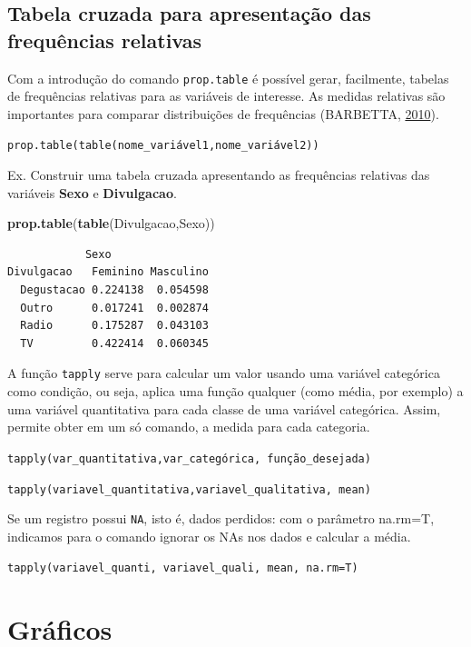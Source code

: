 \documentclass[12pt,brazil,oneside]{book}
\newenvironment{Shaded}{\begin{snugshade}}{\end{snugshade}}
\newcommand{\KeywordTok}[1]{\textcolor[rgb]{0.13,0.29,0.53}{\textbf{#1}}}
\newcommand{\NormalTok}[1]{#1}
\begin{document}
\hypertarget{tabela-cruzada-para-apresentacao-das-frequencias-relativas}{%
\subsection{Tabela cruzada para apresentação das frequências relativas}\label{tabela-cruzada-para-apresentacao-das-frequencias-relativas}}

Com a introdução do comando \texttt{prop.table} é possível gerar, facilmente, tabelas de frequências relativas para as variáveis de interesse. As medidas relativas são importantes para comparar distribuições de frequências (BARBETTA, \protect\hyperlink{ref-barbetta1988}{2010}).

\texttt{prop.table(table(nome\_variável1,nome\_variável2))}

Ex. Construir uma tabela cruzada apresentando as frequências relativas das variáveis \textbf{Sexo} e \textbf{Divulgacao}.

\begin{Shaded}
\begin{Highlighting}[]
\KeywordTok{prop.table}\NormalTok{(}\KeywordTok{table}\NormalTok{(Divulgacao,Sexo))}
\end{Highlighting}
\end{Shaded}

\begin{verbatim}
            Sexo
Divulgacao   Feminino Masculino
  Degustacao 0.224138  0.054598
  Outro      0.017241  0.002874
  Radio      0.175287  0.043103
  TV         0.422414  0.060345
\end{verbatim}

A função \texttt{tapply} serve para calcular um valor usando uma variável categórica como condição, ou seja, aplica uma função qualquer (como média, por exemplo) a uma variável quantitativa para cada classe de uma variável categórica. Assim, permite obter em um só comando, a medida para cada categoria.

\texttt{tapply(var\_quantitativa,var\_categórica,\ função\_desejada)}

\texttt{tapply(variavel\_quantitativa,variavel\_qualitativa,\ mean)}

Se um registro possui \texttt{NA}, isto é, dados perdidos: com o parâmetro na.rm=T, indicamos para o comando ignorar os NAs nos dados e calcular a média.

\texttt{tapply(variavel\_quanti,\ variavel\_quali,\ mean,\ na.rm=T)}

\hypertarget{graficos}{%
\section{Gráficos}\label{graficos}}
\end{document}
